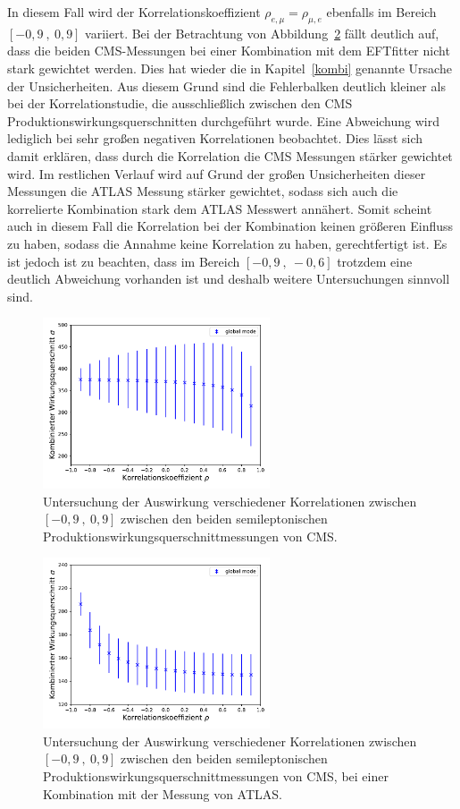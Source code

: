 In diesem Fall wird der Korrelationskoeffizient $\rho_{e, \mu}= \rho_{\mu, e}$ ebenfalls im Bereich $[-0,9~,~0,9]$ variiert. Bei der Betrachtung von Abbildung~\ref{fig:corrca} fällt deutlich auf, dass die beiden CMS-Messungen bei einer Kombination mit dem EFTfitter nicht stark gewichtet werden. Dies hat wieder die in Kapitel~\ref{kombi} genannte Ursache der Unsicherheiten. Aus diesem Grund sind die Fehlerbalken deutlich kleiner als bei der Korrelationstudie, die ausschließlich zwischen den CMS Produktionswirkungsquerschnitten durchgeführt wurde. Eine Abweichung wird lediglich bei sehr großen negativen Korrelationen beobachtet.
Dies lässt sich damit erklären, dass durch die Korrelation die CMS Messungen stärker gewichtet wird. Im restlichen Verlauf wird auf Grund der großen Unsicherheiten dieser Messungen die ATLAS Messung stärker gewichtet, sodass sich auch die korrelierte Kombination stark dem ATLAS Messwert annähert. Somit scheint auch in diesem Fall die Korrelation bei der Kombination keinen größeren Einfluss zu haben, sodass die Annahme keine Korrelation zu haben, gerechtfertigt ist. Es ist jedoch ist zu beachten, dass im Bereich $[-0,9~,~-0,6]$ trotzdem eine deutlich Abweichung vorhanden ist und deshalb weitere Untersuchungen sinnvoll sind.\\
\begin{figure}
  \centering
  \includegraphics[width=0.6\textwidth]{Plots/corr_CMS.pdf}
  \caption{Untersuchung der Auswirkung verschiedener Korrelationen zwischen $[-0,9~,~0,9]$ zwischen den beiden semileptonischen Produktionswirkungsquerschnittmessungen von CMS.}
  \label{fig:corrcms}
\end{figure}
\begin{figure}
  \centering
  \includegraphics[width=0.6\textwidth]{Plots/fcorr_cms.pdf}
  \caption{Untersuchung der Auswirkung verschiedener Korrelationen zwischen $[-0,9~,~0,9]$ zwischen den beiden semileptonischen Produktionswirkungsquerschnittmessungen von CMS, bei einer Kombination mit der Messung von ATLAS.}
  \label{fig:corrca}
\end{figure}
